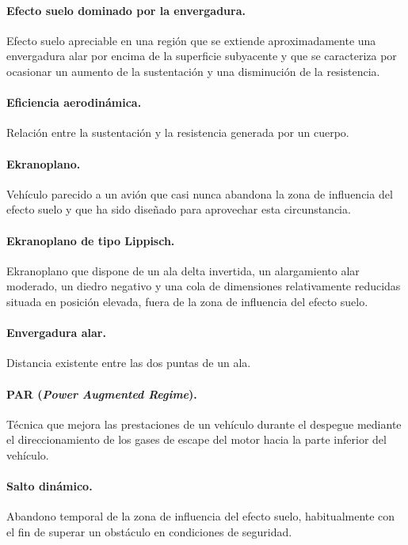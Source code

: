 \paragraph{Efecto suelo dominado por la envergadura.} Efecto suelo apreciable en una región que se extiende aproximadamente una envergadura alar por encima de la superficie subyacente y que se caracteriza por ocasionar un aumento de la sustentación y una disminución de la resistencia.

\paragraph{Eficiencia aerodinámica.} Relación entre la sustentación y la resistencia generada por un cuerpo.

\paragraph{Ekranoplano.} Vehículo parecido a un avión que casi nunca abandona la zona de influencia del efecto suelo y que ha sido diseñado para aprovechar esta circunstancia.

\paragraph{Ekranoplano de tipo Lippisch.} Ekranoplano que dispone de un ala delta invertida, un alargamiento alar moderado, un diedro negativo y una cola de dimensiones relativamente reducidas situada en posición elevada, fuera de la zona de influencia del efecto suelo.

\paragraph{Envergadura alar.} Distancia existente entre las dos puntas de un ala.

\paragraph{PAR (\emph{Power Augmented Regime}).} Técnica que mejora las prestaciones de un vehículo durante el despegue mediante el direccionamiento de los gases de escape del motor hacia la parte inferior del vehículo.

\paragraph{Salto dinámico.} Abandono temporal de la zona de influencia del efecto suelo, habitualmente con el fin de superar un obstáculo en condiciones de seguridad.

